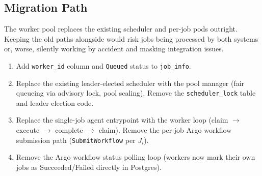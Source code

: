 \documentclass[11pt]{article}
\begin{document}
\subsection{Migration Path}

The worker pool replaces the existing scheduler and per-job pods outright.
Keeping the old paths alongside would risk jobs being processed by both systems
or, worse, silently working by accident and masking integration issues.

\begin{enumerate}
\item Add \texttt{worker\_id} column and \texttt{Queued} status to \texttt{job\_info}.
\item Replace the existing leader-elected scheduler with the pool manager
  (fair queueing via advisory lock, pool scaling). Remove the
  \texttt{scheduler\_lock} table and leader election code.
\item Replace the single-job agent entrypoint with the worker loop
  (claim $\to$ execute $\to$ complete $\to$ claim). Remove the per-job Argo
  workflow submission path (\texttt{SubmitWorkflow} per $J_i$).
\item Remove the Argo workflow status polling loop (workers now mark their own
  jobs as Succeeded/Failed directly in Postgres).
\end{enumerate}
\end{document}
